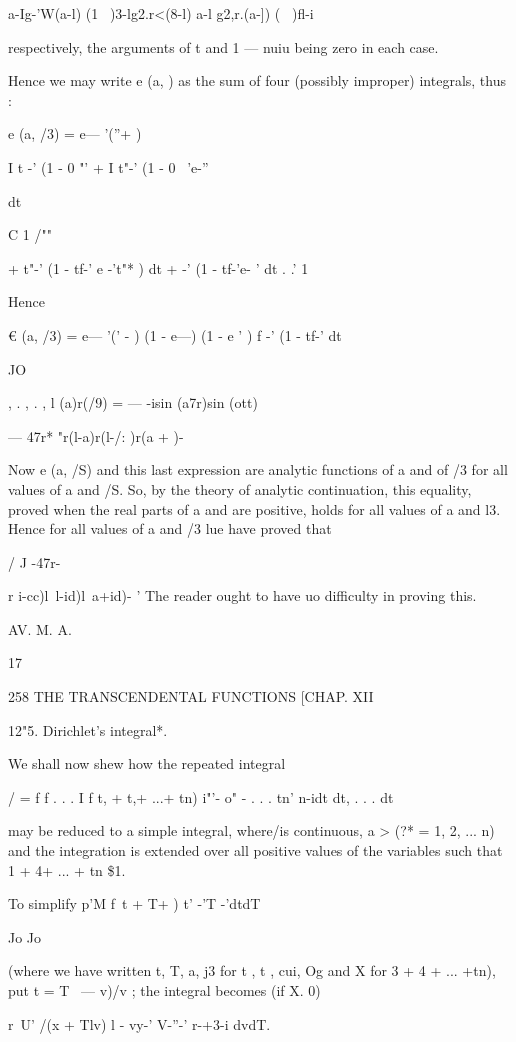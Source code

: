  a-Ig-'W(a-l) (1 \ )3-lg2.r<(8-l) a-l g2,r.(a-]) ( \ )fl-i

respectively, the arguments of t and 1 — nuiu being zero in each case.

Hence we may write e (a, ) as the sum of four (possibly improper)
integrals, thus :

e (a, /3) = e— '(''+ )

I t -' (1 - 0 "' + I t"-' (1 - 0 ~'e-''

 dt

C 1 /""

+ t"-' (1 - tf-' e -'t"* ) dt + -' (1 - tf-'e- ' dt . .' 1

Hence

€ (a, /3) = e— '(' - ) (1 - e---) (1 - e ' ) f -' (1 - tf-' dt

JO

, . , . , l (a)r(/9) = — -isin (a7r)sin (ott) ~

— 47r* "r(l-a)r(l-/: )r(a + )-

Now e (a, /S) and this last expression are analytic functions of a and
of /3 for all values of a and /S. So, by the theory of analytic
continuation, this equality, proved when the real parts of a and are
positive, holds for all values of a and l3. Hence for all values of a
and /3 lue have proved that

/ J -47r-

r i-cc)l\ l-id)l\ a+id)- ' The reader ought to have uo difficulty in
proving this.

AV. M. A.

17

258 THE TRANSCENDENTAL FUNCTIONS [CHAP. XII

12"5. Dirichlet's integral*.

We shall now shew how the repeated integral

/ = f f . . . I f t, + t,+ ...+ tn) i"'- o" - . . . tn' n-idt dt, . .
. dt

may be reduced to a simple integral, where/is continuous, a > (?* = 1,
2, ... n) and the integration is extended over all positive values of
the variables such that 1 + 4+ ... + tn \$1.

To simplify p'M f\ t + T+ ) t' -'T -'dtdT

Jo Jo

(where we have written t, T, a, j3 for t , t , cui, Og and X for 3 + 4
+ ... +tn), put t = T \ — v)/v ; the integral becomes (if X. 0)

r~U' /(x + Tlv) l - vy-' V-''-' r-+3-i dvdT.

